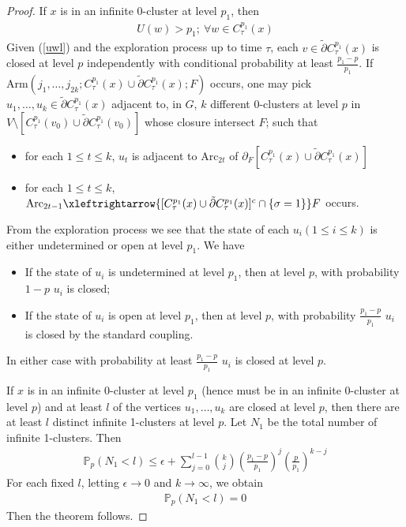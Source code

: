 \documentclass[11pt]{amsart}
\theoremstyle{plain}
\numberwithin{equation}{section}
\numberwithin{figure}{section}
\newcommand\PP{{\mathbb P}}
\begin{document}
\begin{proof}
If $x$ is in an infinite 0-cluster at level $p_1$, then 
\begin{align}
U(w)> p_1;\ \forall w\in C_{\tau}^{p_1}(x)\label{uwl}
\end{align}
Given (\ref{uwl}) and the exploration process up to time $\tau$, each $v\in \tilde{\partial} C_{\tau}^{p_1}(x)$ is closed at level $p$ independently with conditional probability at least $\frac{p_1-p}{p_1}$. If $\mathrm{Arm}(j_1,\ldots,j_{2k};C_{\tau}^{p_1}(x)\cup \tilde{\partial} C_{\tau}^{p_1}(x);F)$ occurs, one may pick $u_1,\ldots,u_k\in \tilde{\partial} C_{\tau}^{p_1}(x)$ adjacent to, in $G$, $k$ different 0-clusters at level $p$ in $V\setminus[C_{\tau}^{p_1}(v_0)\cup \tilde{\partial} C_{\tau}^{p_1}(v_0)]$ whose closure intersect $F$; such that
\begin{itemize}
\item for each $1\leq t\leq k$, $u_t$  is adjacent to $\mathrm{Arc}_{2t}$ of $\partial_F[C_{\tau}^{p_1}(x)\cup \tilde{\partial} C_{\tau}^{p_1}(x)]$
\item for each $1\leq t\leq k$,
$\mathrm{Arc}_{2t-1}\xleftrightarrow {[C_{\tau}^{p_1}(x)\cup \tilde{\partial} C_{\tau}^{p_1}(x)]^c\cap \{\sigma=1\}}F$ occurs.
\end{itemize}

From the exploration process we see that the state of each $u_i (1\leq i\leq k)$ is either undetermined or open at level $p_1$. We have
\begin{itemize}
\item If the state of $u_i$ is undetermined at level $p_1$, then at level $p$, with probability $1-p$ $u_i$ is closed;
\item If the state of $u_i$ is open at level $p_1$, then at level $p$, with probability $\frac{p_1-p}{p_1}$ $u_i$ is closed by the standard coupling.
\end{itemize}
In either case with probability at least $\frac{p_1-p}{p_1}$ $u_i$ is closed at level $p$.


If $x$ is in an infinite 0-cluster at level $p_1$ (hence must be in an infinite 0-cluster at level $p$) and at least $l$ of the vertices $u_1,\ldots,u_k$ are closed at level $p$, then there are at least $l$ distinct infinite 1-clusters at level $p$. Let $N_1$ be the total number of infinite 1-clusters. Then
\begin{align*}
\PP_p(N_1<l)\leq \epsilon+\sum_{j=0}^{l-1}{k\choose j}
\left(\frac{p_1-p}{p_1}\right)^j
\left(\frac{p}{p_1}\right)^{k-j}
\end{align*}
For each fixed $l$, letting $\epsilon\rightarrow 0$ and $k\rightarrow\infty$, we obtain 
\begin{align*}
\PP_p(N_1<l)=0
\end{align*}
 Then the theorem follows.
\end{proof}
\end{document}
